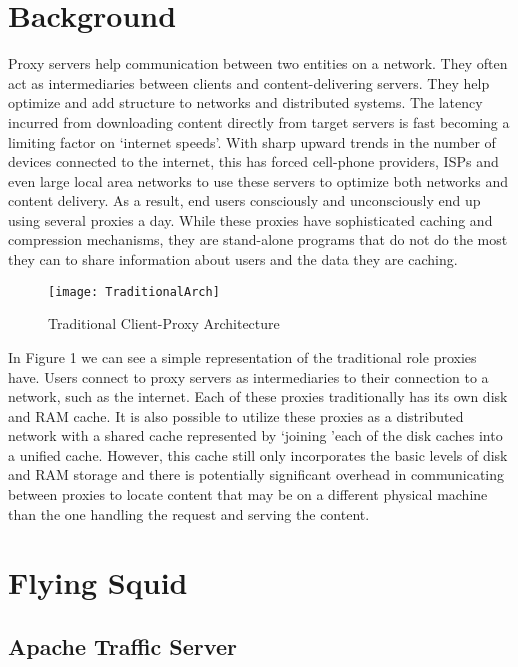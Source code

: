 

\section{Background}

Proxy servers help communication between two entities on a network. They often act as intermediaries between clients and content-delivering servers. They help optimize and add structure to networks and distributed systems. The latency incurred from downloading content directly from target servers is fast becoming a limiting factor on ‘internet speeds’. With sharp upward trends in the number of devices connected to the internet, this has forced cell-phone providers, ISPs and even large local area networks to use these servers to optimize both networks and content delivery. As a result, end users consciously and unconsciously end up using several proxies a day. While these proxies have sophisticated caching and compression mechanisms, they are stand-alone programs that do not do the most they can to share information about users and the data they are caching.

\begin{figure}[H] \centering
\texttt{[image: TraditionalArch]}
\caption{Traditional Client-Proxy Architecture}
\end{figure}


In Figure 1 we can see a simple representation of the traditional role proxies have. Users connect to proxy servers as intermediaries to their connection to a network, such as the internet. Each of these proxies traditionally has its own disk and RAM cache. It is also possible to utilize these proxies as a distributed network with a shared cache represented by \lq joining \rq each of the disk caches into a unified cache. However, this cache still only incorporates the basic levels of disk and RAM storage and there is potentially significant overhead in communicating between proxies to locate content that may be on a different physical machine than the one handling the request and serving the content.





\section{Flying Squid}

\subsection{Apache Traffic Server}

